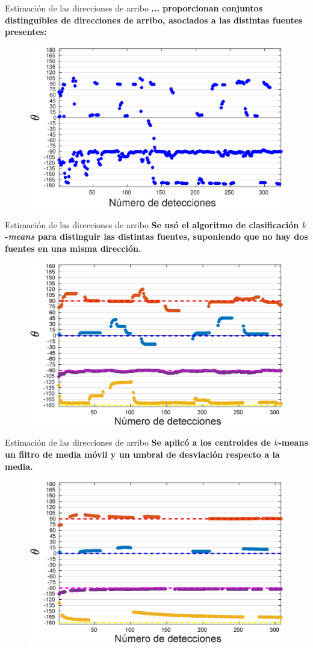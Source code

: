 \documentclass[12pt,aspectratio=169]{beamer}
\begin{document}
	\begin{frame}{Estimación de las direcciones de arribo}
		\textbf{... proporcionan conjuntos distinguibles de direcciones de arribo, asociados a las distintas fuentes presentes:}
		
		\begin{figure}[h]
			\centering
			\includegraphics[width=0.65\linewidth]{figures/plot4uncolor}
		\end{figure}
	\end{frame}
	\begin{frame}{Estimación de las direcciones de arribo}
		\textbf{Se usó el algoritmo de clasificación $k$-\textit{means} para distinguir las distintas fuentes, suponiendo que no hay dos fuentes en una misma dirección.}
		
		\begin{figure}[h]
			\centering
			\includegraphics[width=0.65\linewidth]{figures/plot4colornomean}
		\end{figure}
	\end{frame}
	
	\begin{frame}{Estimación de las direcciones de arribo}
		\textbf{Se aplicó a los centroides de $k$-means un filtro de media móvil y un umbral de desviación respecto a la media.}
		
		\begin{figure}[h]
			\centering
			\includegraphics[width=0.65\linewidth]{figures/plot4color}
		\end{figure}
	\end{frame}
	
\end{document}
